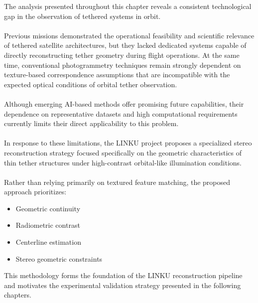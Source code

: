 The analysis presented throughout this chapter reveals a consistent technological gap in the observation of tethered systems in orbit.
\\\\
Previous missions demonstrated the operational feasibility and scientific relevance of tethered satellite architectures, but they lacked dedicated systems capable of directly reconstructing tether geometry during flight operations. At the same time, conventional photogrammetry techniques remain strongly dependent on texture-based correspondence assumptions that are incompatible with the expected optical conditions of orbital tether observation.
\\\\
Although emerging AI-based methods offer promising future capabilities, their dependence on representative datasets and high computational requirements currently limits their direct applicability to this problem.
\\\\
In response to these limitations, the LINKU project proposes a specialized stereo reconstruction strategy focused specifically on the geometric characteristics of thin tether structures under high-contrast orbital-like illumination conditions.
\\\\
Rather than relying primarily on textured feature matching, the proposed approach prioritizes:
\begin{itemize}
    \item Geometric continuity
    \item Radiometric contrast
    \item Centerline estimation
    \item Stereo geometric constraints
\end{itemize}

This methodology forms the foundation of the LINKU reconstruction pipeline and motivates the experimental validation strategy presented in the following chapters.
